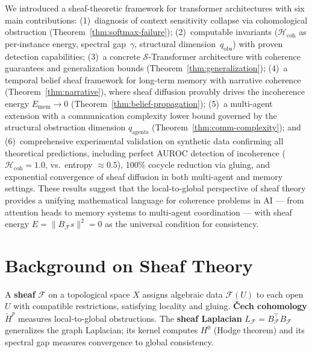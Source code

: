 \documentclass[11pt,a4paper]{article}
\theoremstyle{plain}
\theoremstyle{definition}
\theoremstyle{remark}
\newcommand{\cF}{\mathcal{F}}
\newcommand{\cS}{\mathcal{S}}
\newcommand{\Hcoh}{\mathcal{H}_{\mathrm{coh}}}
\newcommand{\CechH}{\check{H}}
\begin{document}
We introduced a sheaf-theoretic framework for transformer architectures with six main contributions: (1)~diagnosis of context sensitivity collapse via cohomological obstruction (Theorem~\ref{thm:softmax-failure}); (2)~computable invariants ($\Hcoh$ as per-instance energy, spectral gap~$\gamma$, structural dimension~$q_{\mathrm{obs}}$) with proven detection capabilities; (3)~a concrete $\cS$-Transformer architecture with coherence guarantees and generalization bounds (Theorem~\ref{thm:generalization}); (4)~a temporal belief sheaf framework for long-term memory with narrative coherence (Theorem~\ref{thm:narrative}), where sheaf diffusion provably drives the incoherence energy $E_{\mathrm{mem}} \to 0$ (Theorem~\ref{thm:belief-propagation}); (5)~a multi-agent extension with a communication complexity lower bound governed by the structural obstruction dimension $q_{\mathrm{agents}}$ (Theorem~\ref{thm:comm-complexity}); and (6)~comprehensive experimental validation on synthetic data confirming all theoretical predictions, including perfect AUROC detection of incoherence ($\Hcoh = 1.0$, vs.\ entropy $\approx 0.5$), 100\% cocycle reduction via gluing, and exponential convergence of sheaf diffusion in both multi-agent and memory settings. These results suggest that the local-to-global perspective of sheaf theory provides a unifying mathematical language for coherence problems in AI --- from attention heads to memory systems to multi-agent coordination --- with sheaf energy $E = \|B_\cF s\|^2 = 0$ as the universal condition for consistency.

\appendix
\section{Background on Sheaf Theory}\label{app:sheaves}
A \textbf{sheaf} $\cF$ on a topological space $X$ assigns algebraic data $\cF(U)$ to each open $U$ with compatible restrictions, satisfying locality and gluing. \textbf{\v{C}ech cohomology} $\CechH^p$ measures local-to-global obstructions. The \textbf{sheaf Laplacian} $L_\cF = B_\cF^\top B_\cF$ generalizes the graph Laplacian; its kernel computes $H^0$ (Hodge theorem) and its spectral gap measures convergence to global consistency.
\end{document}
